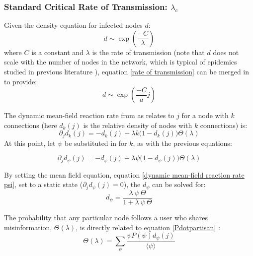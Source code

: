 \documentclass[preprint,review,12pt]{elsarticle}
\begin{document}
\subsubsection{Standard Critical Rate of Transmission: $\lambda_c$}

Given the density equation for infected nodes $d$: \begin{equation}
    \label{densityequation}
    d \sim \exp\left(\frac{ - C}{\lambda}\right)
\end{equation} where $C$ is a constant and $\lambda$ is the rate of transmission \citep{pastor2001epidemic} (note that $d$ does not scale with the number of nodes in the network, which is typical of epidemics studied in previous literature \citep{marro2005nonequilibrium}), equation \ref{rate of transmission}  can be merged in to provide:
\begin{equation}
    d \sim \exp\left(\frac{ - C}{a}j\right)
\end{equation}

The dynamic mean-field reaction rate from \citep{marro2005nonequilibrium,pastor2001dynamics,pastor2001epidemic} as relates to $j$ for a node with $k$ connections (here $d_k(j)$ is the relative density of nodes with $k$ connections) is: 
\begin{equation}
\label{dynamic mean-field reaction rate}
    \partial_jd_k(j) = - d_k(j) + \lambda k \big(1 - d_k(j)\big)\Theta(\lambda)
\end{equation}
At this point, let $\psi$ be substituted in for $k$, as with the previous equations:

\begin{equation}
\label{dynamic mean-field reaction rate psi}
    \partial_jd_{\psi}(j) = - d_{\psi}(j) + \lambda \psi \big(1 - d_{\psi}(j)\big)\Theta(\lambda)
\end{equation}

By setting the mean field equation, equation \ref{dynamic mean-field reaction rate psi}, set to a static state ($\partial_jd_{\psi}(j) = 0$), the $d_{\psi}$ can be solved for:
\begin{equation}
\label{static d_psi}
    d_{\psi} = \frac{\lambda \ \psi \ \Theta}{1 + \lambda \ \psi \ \Theta}
\end{equation}

The probability that any particular node follows a user who shares misinformation, $\Theta(\lambda)$, is directly related to equation \ref{Pdotpartisan} :
\begin{equation}
\label{probability of infected node}
    \Theta(\lambda) = \sum_{\psi} \frac{\psi P(\psi)d_{\psi}(j)}{\langle \psi \rangle}
\end{equation}
\end{document}
